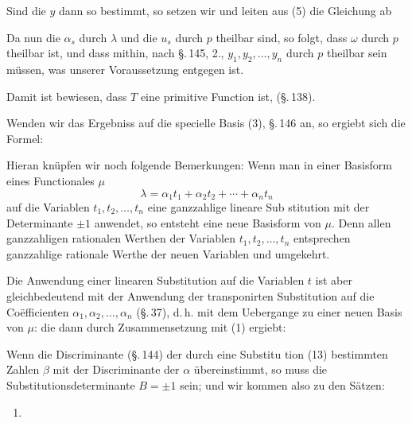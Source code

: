 
Sind die $y$ dann so bestimmt, so setzen wir
und leiten aus (5) die Gleichung ab

Da nun die $\alpha_s$ durch $\lambda$ und die $u_s$ durch $p$ theilbar sind,
so folgt, dass $\omega$ durch $p$ theilbar ist, und dass mithin, nach
\S.\,145, 2., $y_1, y_2, \ldots, y_n$ durch $p$ theilbar sein müssen, was
unserer Voraussetzung entgegen ist.

Damit ist bewiesen, dass $T$ eine primitive Function ist,  (\S.\,138).

Wenden wir das Ergebniss auf die specielle Basis (3), \S.\,146
an, so ergiebt sich die Formel:

Hieran knüpfen wir noch folgende Bemerkungen: Wenn
man in einer Basisform eines Functionales $\mu$
\[
\lambda = \alpha_1 t_1 + \alpha_2 t_2 + \cdots + \alpha_n t_n
\]
auf die Variablen $t_1, t_2, \ldots, t_n$ eine ganzzahlige lineare Sub\-
stitution mit der Determinante $\pm 1$ anwendet, so entsteht eine
neue Basisform von $\mu$. Denn allen ganzzahligen rationalen Werthen
der Variablen $t_1, t_2, \ldots, t_n$ entsprechen ganzzahlige rationale
Werthe der neuen Variablen und umgekehrt.

Die Anwendung einer linearen Substitution auf die Variablen $t$
ist aber gleichbedeutend mit der Anwendung der transponirten
Substitution auf die Co\"efficienten $\alpha_1, \alpha_2, \ldots, \alpha_n$ (\S.\,37), d.\,h. mit
dem Uebergange zu einer neuen Basis von $\mu$:
die dann durch Zusammensetzung mit (1) ergiebt:

Wenn die Discriminante (\S.\,144) der durch eine Substitu\-
tion (13) bestimmten Zahlen $\beta$ mit der Discriminante der $\alpha$
übereinstimmt, so muss die Substitutionsdeterminante $B = \pm 1$
sein; und wir kommen also zu den Sätzen:
\begin{enumerate}
\item[1.] 
\end{enumerate}
